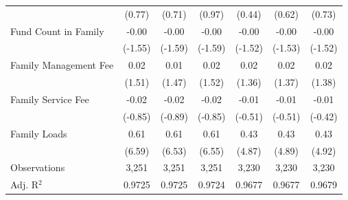 {\begin{tabular}{l*{6}{c}}
                    &      (0.77)         &      (0.71)         &      (0.97)         &      (0.44)         &      (0.62)         &      (0.73)         \\
\addlinespace
Fund Count in Family&       -0.00         &       -0.00         &       -0.00         &       -0.00         &       -0.00         &       -0.00         \\
                    &     (-1.55)         &     (-1.59)         &     (-1.59)         &     (-1.52)         &     (-1.53)         &     (-1.52)         \\
\addlinespace
Family Management Fee&        0.02         &        0.01         &        0.02         &        0.02         &        0.02         &        0.02         \\
                    &      (1.51)         &      (1.47)         &      (1.52)         &      (1.36)         &      (1.37)         &      (1.38)         \\
\addlinespace
Family Service Fee  &       -0.02         &       -0.02         &       -0.02         &       -0.01         &       -0.01         &       -0.01         \\
                    &     (-0.85)         &     (-0.89)         &     (-0.85)         &     (-0.51)         &     (-0.51)         &     (-0.42)         \\
\addlinespace
Family Loads        &        0.61\sym{***}&        0.61\sym{***}&        0.61\sym{***}&        0.43\sym{***}&        0.43\sym{***}&        0.43\sym{***}\\
                    &      (6.59)         &      (6.53)         &      (6.55)         &      (4.87)         &      (4.89)         &      (4.92)         \\
\midrule
Observations        &       3,251         &       3,251         &       3,251         &       3,230         &       3,230         &       3,230         \\
Adj. R$^{2}$        &      0.9725         &      0.9725         &      0.9724         &      0.9677         &      0.9677         &      0.9679         \\
\bottomrule
\end{tabular}
}
